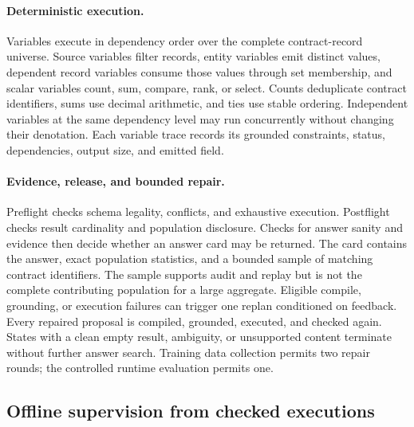 \paragraph{Deterministic execution.}
Variables execute in dependency order over the complete contract-record universe.  Source variables
filter records, entity variables emit distinct values, dependent record variables consume those
values through set membership, and scalar variables count, sum, compare, rank, or select.  Counts
deduplicate contract identifiers, sums use decimal arithmetic, and ties use stable ordering.
Independent variables at the same dependency level may run concurrently without changing their
denotation.  Each variable trace records its grounded constraints, status, dependencies, output
size, and emitted field.

\paragraph{Evidence, release, and bounded repair.}
Preflight checks schema legality, conflicts, and exhaustive execution.  Postflight checks result
cardinality and population disclosure.  Checks for answer sanity and evidence then decide whether an
answer card may be returned.  The card contains the answer, exact population statistics, and a
bounded sample of matching contract identifiers.  The sample supports audit and replay but is not
the complete contributing population for a large aggregate.  Eligible compile, grounding, or
execution failures can trigger one replan conditioned on feedback.  Every repaired proposal is
compiled, grounded, executed, and checked again.  States with a clean empty result, ambiguity, or
unsupported content terminate without further answer search.  Training data collection permits two repair rounds;
the controlled runtime evaluation permits one.

\subsection{Offline supervision from checked executions}
\label{sec:m-training}

